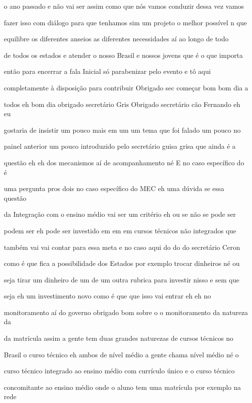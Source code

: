 \documentclass[a4paper,12pt]{article}
\begin{document}
o ano passado e não vai ser assim como que nós vamos conduzir dessa vez vamos

fazer isso com diálogo para que tenhamos sim um projeto o melhor possível n que

equilibre os diferentes anseios as diferentes necessidades aí ao longo de todo

de todos os estados e atender o nosso Brasil e nossos jovens que é o que importa

então para encerrar a fala Inicial só parabenizar pelo evento e tô aqui

completamente à disposição para contribuir Obrigado sec começar bom bom dia a

todos eh bom dia obrigado secretário Gris Obrigado secretário cão Fernando eh eu

gostaria de insistir um pouco mais em um um tema que foi falado um pouco no

painel anterior um pouco introduzido pelo secretário guisa grisa que ainda é a

questão eh eh dos mecanismos aí de acompanhamento né E no caso específico do é

uma pergunta pros dois no caso específico do MEC eh uma dúvida se essa questão

da Integração com o ensino médio vai ser um critério eh ou se não se pode ser

podem ser eh pode ser investido em em em cursos técnicos não integrados que

também vai vai contar para essa meta e no caso aqui do do do secretário Ceron

como é que fica a possibilidade dos Estados por exemplo trocar dinheiros né ou

seja tirar um dinheiro de um de um outra rubrica para investir nisso e sem que

seja eh um investimento novo como é que que isso vai entrar eh eh no

monitoramento aí do governo obrigado bom sobre o o monitoramento da natureza da

da matrícula assim a gente tem duas grandes naturezas de cursos técnicos no

Brasil o curso técnico eh ambos de nível médio a gente chama nível médio né o

curso técnico integrado ao ensino médio com currículo único e o curso técnico

concomitante ao ensino médio onde o aluno tem uma matrícula por exemplo na rede
\end{document}
